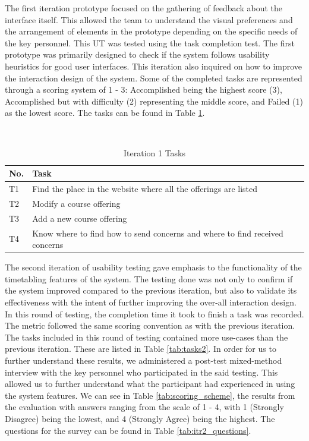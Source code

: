 The first iteration prototype focused on the gathering of feedback about the interface itself. This allowed the team to understand the visual preferences and the arrangement of elements in the prototype depending on the specific needs of the key personnel. This UT was tested using the task completion test. The first prototype was primarily designed to check if the system follows usability heuristics for good user interfaces. This iteration also inquired on how to improve the interaction design of the system. Some of the completed tasks are represented through a scoring system of 1 - 3: Accomplished being the highest score (3), Accomplished but with diﬃculty (2) representing the middle score, and Failed (1) as the lowest score. The tasks can be found in Table \ref{tab:tasks1}.
\begin{table}
  \centering
  \caption{Iteration 1 Tasks}~\label{tab:tasks1}
  \addtolength{\tabcolsep}{2pt} 
  \begin{tabular}{p{0.5cm}|p{6.5cm}}
  	\toprule
    \rule{0pt}{8pt}No. & Task \\[2pt]
    \toprule
    T1 & Find the place in the website where all the offerings are listed \\
    T2 & Modify a course offering \\
    T3 & Add a new course offering \\
    T4 & Know where to find how to send concerns and where to find received concerns \\
    \bottomrule
  \end{tabular}
  \addtolength{\tabcolsep}{-2pt} 
\end{table}
The second iteration of usability testing gave emphasis to the functionality of the timetabling features of the system. The testing done was not only to confirm if the system improved compared to the previous iteration, but also to validate its effectiveness with the intent of further improving the over-all interaction design. In this round of testing, the completion time it took to finish a task was recorded. The metric followed the same scoring convention as with the previous iteration. The tasks included in this round of testing contained more use-cases than the previous iteration. These are listed in Table \ref{tab:tasks2}. In order for us to further understand these results, we administered a post-test mixed-method interview  with the key personnel who participated in the said testing. This allowed us to further understand what the participant had experienced in using the system features. We can see in Table \ref{tab:scoring_scheme}, the results from the evaluation with answers ranging from the scale of 1 - 4, with 1 (Strongly Disagree) being the lowest, and 4 (Strongly Agree) being the highest. The questions for the survey can be found in Table \ref{tab:itr2_questions}. 

